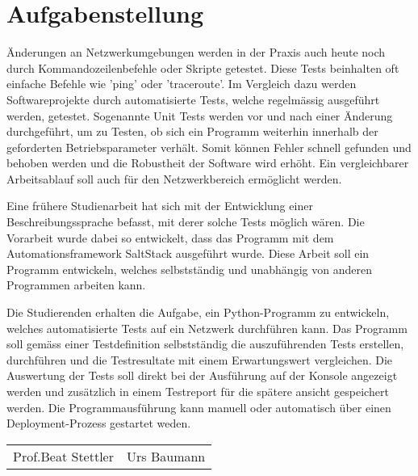 \documentclass[]{subfiles}
\begin{document}
\section*{Aufgabenstellung}

Änderungen an Netzwerkumgebungen werden in der Praxis auch heute 
noch durch Kommandozeilenbefehle oder Skripte getestet.
Diese Tests beinhalten oft einfache Befehle wie 'ping' oder 'traceroute'.
Im Vergleich dazu werden Softwareprojekte durch automatisierte Tests, 
welche regelmässig ausgeführt werden, getestet.
Sogenannte Unit Tests werden vor und nach einer Änderung durchgeführt, 
um zu Testen, ob sich ein Programm weiterhin innerhalb der geforderten 
Betriebsparameter verhält. 
Somit können Fehler schnell gefunden und behoben werden und die Robustheit
der Software wird erhöht.
Ein vergleichbarer Arbeitsablauf soll auch für den Netzwerkbereich ermöglicht werden.

Eine frühere Studienarbeit hat sich mit der Entwicklung einer Beschreibungssprache
befasst, mit derer solche Tests möglich wären.
Die Vorarbeit wurde dabei so entwickelt, dass das Programm mit dem Automationsframework 
SaltStack ausgeführt wurde. 
Diese Arbeit soll ein Programm entwickeln, welches selbstständig und unabhängig 
von anderen Programmen arbeiten kann.

Die Studierenden erhalten die Aufgabe, ein Python-Programm zu entwickeln, 
welches automatisierte Tests auf ein Netzwerk durchführen kann.
Das Programm soll gemäss einer Testdefinition selbstständig die 
auszuführenden Tests erstellen, durchführen und die Testresultate mit
einem Erwartungswert vergleichen. 
Die Auswertung der Tests soll direkt bei der Ausführung auf der Konsole
angezeigt werden und zusätzlich in einem Testreport für die spätere 
ansicht gespeichert werden.
Die Programmausführung kann manuell oder automatisch über einen Deployment-Prozess
gestartet weden.

\vspace{5cm}

\begin{tabularx}{\textwidth}{XX}
    Prof.Beat Stettler & Urs Baumann \\
\end{tabularx}

    
\end{document}

